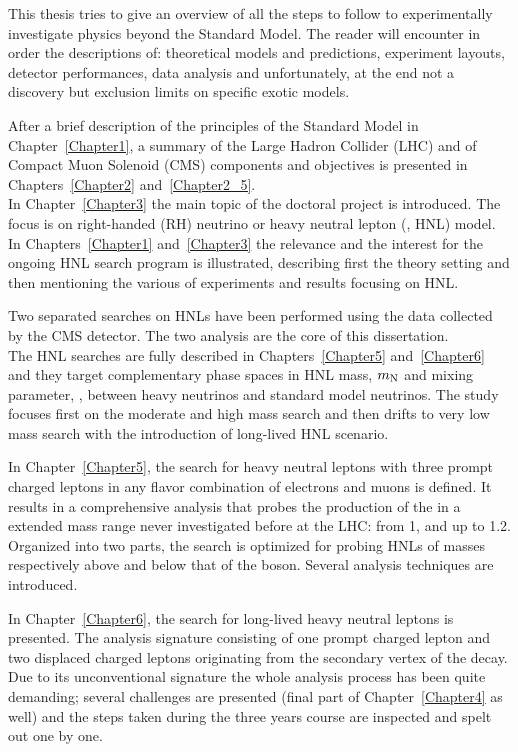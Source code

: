 This thesis tries to give an overview of all the steps to follow
to experimentally investigate physics
beyond the Standard Model. The reader will encounter in order the
descriptions of: theoretical models and predictions, experiment
layouts, detector performances, data analysis and unfortunately, at the
end not a discovery but exclusion limits on specific exotic models.

After a brief description of the principles of the Standard Model in
Chapter~\ref{Chapter1}, a summary of the Large Hadron Collider (LHC)
and of Compact Muon Solenoid (CMS) components and objectives is
presented in Chapters~\ref{Chapter2} and~\ref{Chapter2_5}.\\
In Chapter~\ref{Chapter3} the main topic of the doctoral project is
introduced. The focus is on right-handed (RH) neutrino or heavy
neutral lepton (\hnl, HNL)
model. In Chapters~\ref{Chapter1} and~\ref{Chapter3} 
the relevance and the interest for the
ongoing HNL search program is illustrated, describing first the theory setting 
and then mentioning the various of experiments and results
focusing on HNL.

Two separated searches on HNLs have been performed using the data
collected by the CMS detector. The two analysis are the core of this
dissertation.\\
The HNL searches are fully described in Chapters~\ref{Chapter5}
and~\ref{Chapter6} and they target complementary phase spaces in HNL mass, $m_\mathrm{N}$
and mixing parameter, \mixpar, between heavy neutrinos and standard
model neutrinos. The study focuses first on the
moderate and high mass search and then drifts to very low mass search with
the introduction of long-lived HNL scenario.

In Chapter~\ref{Chapter5}, the search for heavy neutral leptons with three
prompt charged leptons in any flavor combination of electrons and
muons is defined. It results in a comprehensive analysis that probes the production of the
\hnl in a extended mass range never investigated before at the LHC:
from 1\GeV, and up to 1.2\TeV. 
Organized into two parts, the search is optimized for
probing HNLs of masses respectively above and below that of the \PW
boson. Several analysis techniques are introduced.

In Chapter~\ref{Chapter6}, the search for long-lived heavy neutral
leptons is presented. The analysis signature
consisting of one prompt charged lepton and two displaced
charged leptons originating from the secondary vertex of the \hnl
decay. Due to its unconventional signature the whole analysis process has been
quite demanding; several challenges are presented (final part of
Chapter~\ref{Chapter4} as well) and the steps taken during the three
years course are inspected and spelt out one by one.

